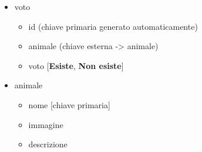 \begin{itemize}
        \item voto
        \begin{itemize}
            \item id (chiave primaria generato automaticamente)
            \item animale (chiave esterna -> animale)
            \item voto [\textbf{Esiste}, \textbf{Non esiste}]
        \end{itemize}

        \item animale
        \begin{itemize}
            \item nome [chiave primaria]
            \item immagine
            \item descrizione
        \end{itemize}
    \end{itemize}